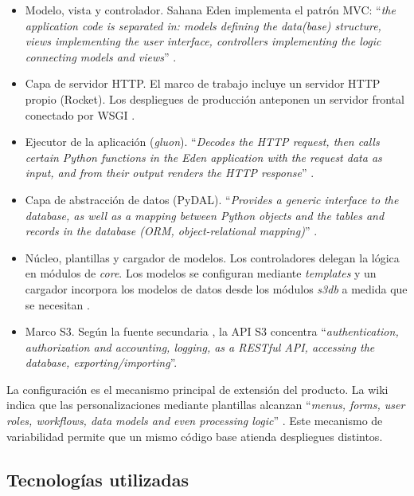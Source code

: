 \documentclass[11pt,letterpaper]{article}
\begin{document}
\begin{itemize}
  \item Modelo, vista y controlador. Sahana Eden implementa el patrón MVC: \enquote{\emph{the
        application code is separated in: models defining the data(base) structure, views
        implementing the user interface, controllers implementing the logic connecting models and
        views}} \cite{eden-basics}.
  \item Capa de servidor HTTP. El marco de trabajo incluye un servidor HTTP propio (Rocket). Los
        despliegues de producción anteponen un servidor frontal conectado por WSGI
        \cite{eden-basics}.
  \item Ejecutor de la aplicación (\emph{gluon}). \enquote{\emph{Decodes the HTTP request, then
        calls certain Python functions in the Eden application with the request data as input, and
        from their output renders the HTTP response}} \cite{eden-basics}.
  \item Capa de abstracción de datos (PyDAL). \enquote{\emph{Provides a generic interface to the
        database, as well as a mapping between Python objects and the tables and records in the
        database (ORM, object-relational mapping)}} \cite{eden-basics}.
  \item Núcleo, plantillas y cargador de modelos. Los controladores delegan la lógica en módulos de
        \emph{core}. Los modelos se configuran mediante \emph{templates} y un cargador incorpora los
        modelos de datos desde los módulos \emph{s3db} a medida que se necesitan \cite{eden-basics}.
  \item Marco S3. Según la fuente secundaria \cite{desosa2018}, la API S3 concentra
        \enquote{\emph{authentication, authorization and accounting, logging, as a RESTful API,
        accessing the database, exporting/importing}}.
\end{itemize}

La configuración es el mecanismo principal de extensión del producto. La wiki indica que las
personalizaciones mediante plantillas alcanzan \enquote{\emph{menus, forms, user roles, workflows,
data models and even processing logic}} \cite{eden-wiki}. Este mecanismo de variabilidad permite que
un mismo código base atienda despliegues distintos.

\subsection{Tecnologías utilizadas}
\end{document}
